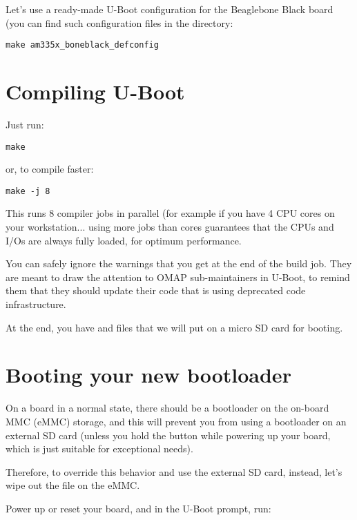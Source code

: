 Let's use a ready-made U-Boot configuration for the Beaglebone Black
board (you can find such configuration files in the 
directory:

\begin{verbatim}
make am335x_boneblack_defconfig
\end{verbatim}

\section{Compiling U-Boot}

Just run:
\begin{verbatim}
make
\end{verbatim}

or, to compile faster:

\begin{verbatim}
make -j 8
\end{verbatim}

This runs 8 compiler jobs in parallel (for example if you have 4 CPU
cores on your workstation... using more jobs than cores guarantees that
the CPUs and I/Os are always fully loaded, for optimum performance.

You can safely ignore the warnings that you get at the end of the build
job. They are meant to draw the attention to OMAP sub-maintainers in
U-Boot, to remind them that they should update their code that is
using deprecated code infrastructure.

At the end, you have  and  files that we will
put on a micro SD card for booting.




\section{Booting your new bootloader}

On a board in a normal state, there should be a bootloader on the on-board MMC
(eMMC) storage, and this will prevent you from using a bootloader on an
external SD card (unless you hold the  button while powering
up your board, which is just suitable for exceptional needs).

Therefore, to override this behavior and use the external SD card,
instead, let's wipe out the  file on the eMMC.

Power up or reset your board, and in the U-Boot prompt, run:

